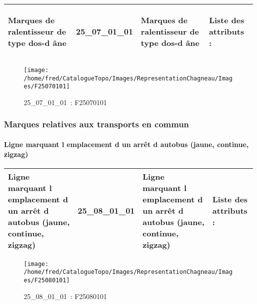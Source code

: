 \documentclass[12pt,titlepage,oneside]{book}
\begin{document}
\renewcommand{\arraystretch}{1.2}
\begin{supertabular}{|p{10cm}|c|p{13cm}|p{12cm}|}
 Marques de ralentisseur de type dos-d âne & 25\_07\_01\_01 & Marques de ralentisseur de type dos-d âne & Liste des attributs :
\begin{enumerate}
\end{enumerate}
\\
\hline
\end{supertabular}
\begin{figure}[h!]
  \hfill         %
  \begin{minipage}[t]{3cm}
    \begin{center}
      \texttt{[image: /home/fred/CatalogueTopo/Images/RepresentationChagneau/Images/F25070101]}
      \caption[~25\_07\_01\_01]{\small{25\_07\_01\_01~:} \tiny{F25070101}}\label{F25070101}
    \end{center}
  \end{minipage}
\end{figure}

\subsubsection{\large Marques relatives aux transports en commun}
\paragraph{Ligne marquant l emplacement d un arrêt d autobus (jaune, continue, zigzag)}
\noindent
\vspace{\baselineskip}

\renewcommand{\arraystretch}{1.2}
\begin{supertabular}{|p{10cm}|c|p{13cm}|p{12cm}|}
 Ligne marquant l emplacement d un arrêt d autobus (jaune, continue, zigzag) & 25\_08\_01\_01 & Ligne marquant l emplacement d un arrêt d autobus (jaune, continue, zigzag) & Liste des attributs :
\begin{enumerate}
\end{enumerate}
\\
\hline
\end{supertabular}
\begin{figure}[h!]
  \hfill         %
  \begin{minipage}[t]{3cm}
    \begin{center}
      \texttt{[image: /home/fred/CatalogueTopo/Images/RepresentationChagneau/Images/F25080101]}
      \caption[~25\_08\_01\_01]{\small{25\_08\_01\_01~:} \tiny{F25080101}}\label{F25080101}
    \end{center}
  \end{minipage}
\end{figure}
\end{document}
